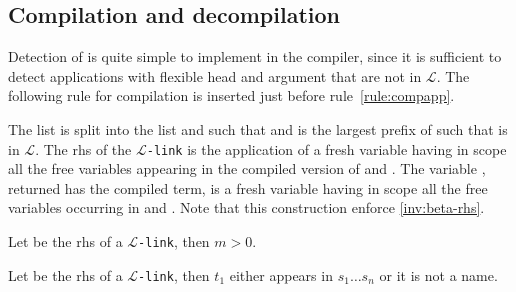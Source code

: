 \documentclass[sigconf,natbib=false,review]{acmart}
\newcommand{\appsep}{\ensuremath{\textcolor{lightgray}{\cdot}}}
\newcommand{\llambda}{\ensuremath{\mathcal{L}}\xspace}
\newcommand{\linkMacro}[1]{\ensuremath{#1}\texttt{-link}\xspace}
\newcommand{\linkbeta}{\linkMacro{\llambda}}
\newcommand{\Fo}{\texorpdfstring{\ensuremath{\mathcal{F}_{\!o}\xspace}}{Fo}} %
\newcommand{\rhs}{rhs\xspace}
\begin{document}
\subsection{Compilation and decompilation}

Detection of \notllambda is quite simple to implement in the compiler, since it
is sufficient to detect applications with flexible head and argument that
are not in \llambda. The following rule for \notllambda compilation is inserted 
just before rule~\ref{rule:compapp}.




The list  is split into the list  and  such
that  and  is the largest prefix of
 such that  is in \llambda. The \rhs of the \linkbeta is
the application of a fresh variable  having in scope all the free
variables appearing in the compiled version of  and . The
variable , returned has the compiled term, is a fresh variable having in
scope all the free variables occurring in  and .
Note that this construction enforce \cref{inv:beta-rhs}.


\begin{corollary}
  Let \rhsBeta be the \rhs of a \linkbeta, then $m > 0$.
\end{corollary}

\begin{comment}
\begin{proof}[Proof sketch]
  Assume we have a \linkbeta, by contradiction, if $m = 0$, then the original
  \Fo{} term has the shape \elpiIn{fapp[fuva M | Ag]} where \elpiIn{Ag} is a
  list of distinct names (i.e. the list \elpiIn{Extra} is empty). This case is
  however captured by rule~\ref{rule:complam} (from \cref{sec:compilation}) and
  no \linkbeta is produced which contradicts our initial assumption.
\end{proof}
\end{comment}

\begin{corollary}
  Let \rhsBeta be the \rhs of a \linkbeta, then $t_1$ either appears in $s_1\dots s_n$ or it is 
  not a name.
\end{corollary}
\end{document}
